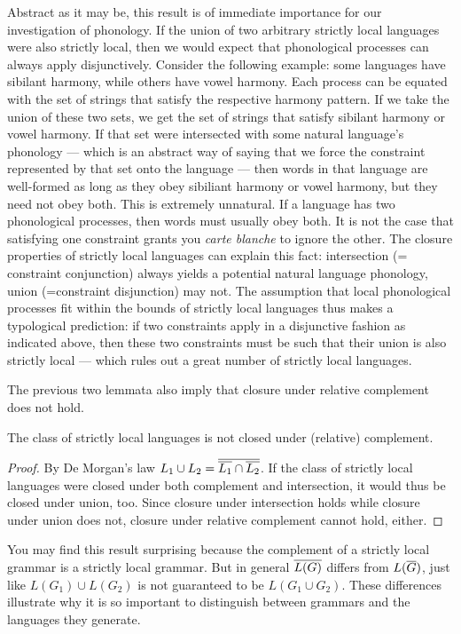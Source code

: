 Abstract as it may be, this result is of immediate importance for our investigation of phonology.
If the union of two arbitrary strictly local languages were also strictly local, then we would expect that phonological processes can always apply disjunctively.
Consider the following example: some languages have sibilant harmony, while others have vowel harmony.
Each process can be equated with the set of strings that satisfy the respective harmony pattern.
If we take the union of these two sets, we get the set of strings that satisfy sibilant harmony or vowel harmony.
If that set were intersected with some natural language's phonology --- which is an abstract way of saying that we force the constraint represented by that set onto the language --- then words in that language are well-formed as long as they obey sibiliant harmony or vowel harmony, but they need not obey both.
This is extremely unnatural. If a language has two phonological processes, then words must usually obey both.
It is not the case that satisfying one constraint grants you \emph{carte blanche} to ignore the other.
The closure properties of strictly local languages can explain this fact: intersection (= constraint conjunction) always yields a potential natural language phonology, union (=constraint disjunction) may not.
The assumption that local phonological processes fit within the bounds of strictly local languages thus makes a typological prediction: if two constraints apply in a disjunctive fashion as indicated above, then these two constraints must be such that their union is also strictly local --- which rules out a great number of strictly local languages.
%

The previous two lemmata also imply that closure under relative complement does not hold.
%
\begin{lemma}
    The class of strictly local languages is not closed under (relative) complement.
\end{lemma}
%
\begin{proof}
    By De Morgan's law $L_1 \cup L_2 =  \overline{ \overline{L_1}  \cap  \overline{L_2} } $.
    If the class of strictly local languages were closed under both complement and intersection, it would thus be closed under union, too.
    Since closure under intersection holds while closure under union does not, closure under relative complement cannot hold, either.
\end{proof}
%
You may find this result surprising because the complement of a strictly local grammar is a strictly local grammar.
But in general $ \overline{L(G)} $ differs from $L( \overline{G} )$, just like $L(G_1) \cup L(G_2)$ is not guaranteed to be $L(G_1 \cup G_2)$.
These differences illustrate why it is so important to distinguish between grammars and the languages they generate.

